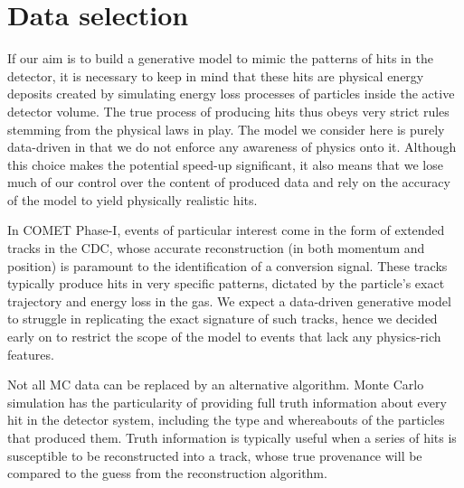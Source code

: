 \section{Data selection} %
If our aim is to build a generative model to mimic the patterns of hits in the detector, it is necessary to keep in mind that these hits are physical energy deposits created by simulating energy loss processes of particles inside the active detector volume. The true process of producing hits thus obeys very strict rules stemming from the physical laws in play. The model we consider here is purely data-driven in that we do not enforce any awareness of physics onto it. Although this choice makes the potential speed-up significant, it also means that we lose much of our control over the content of produced data and rely on the accuracy of the model to yield physically realistic hits.

In COMET Phase-I, events of particular interest come in the form of extended tracks in the CDC, whose accurate reconstruction (in both momentum and position) is paramount to the identification of a conversion signal. These tracks typically produce hits in very specific patterns, dictated by the particle's exact trajectory and energy loss in the gas. We expect a data-driven generative model to struggle in replicating the exact signature of such tracks, hence we decided early on to restrict the scope of the model to events that lack any physics-rich features. 




Not all MC data can be replaced by an alternative algorithm. Monte Carlo simulation has the particularity of providing full truth information about every hit in the detector system, including the type and whereabouts of the particles that produced them.
Truth information is typically useful when a series of hits is susceptible to be reconstructed into a track, whose true provenance will be compared to the guess from the reconstruction algorithm. %

